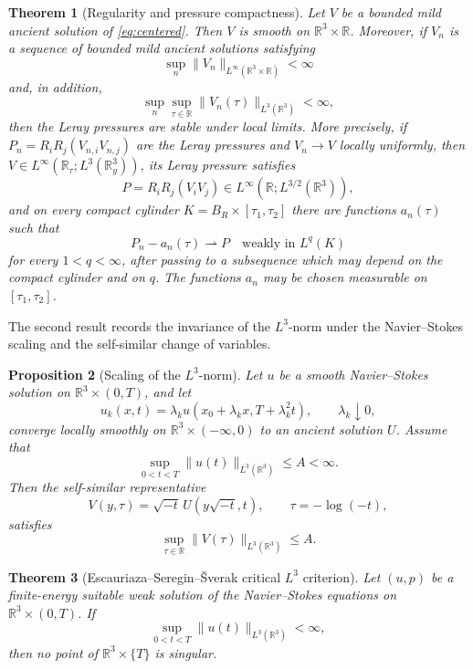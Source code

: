 \documentclass[11pt]{amsart}
\theoremstyle{plain}
\newtheorem{theorem}{Theorem}[section]
\newtheorem{proposition}[theorem]{Proposition}
\theoremstyle{definition}
\theoremstyle{remark}
\numberwithin{equation}{section}
\begin{document}
\begin{theorem}[Regularity and pressure compactness]\label{thm:gauges}
Let \(V\) be a bounded mild ancient solution of \eqref{eq:centered}.  Then
\(V\) is smooth on \(\mathbb R^3\times\mathbb R\).  Moreover, if \(V_n\) is a sequence of
bounded mild ancient solutions satisfying
\[
   \sup_n\|V_n\|_{L^\infty(\mathbb R^3\times\mathbb R)}<\infty
\]
and, in addition,
\[
   \sup_n\sup_{\tau\in\mathbb R}\|V_n(\tau)\|_{L^3(\mathbb R^3)}<\infty,
\]
then the Leray pressures are stable under local limits.  More precisely, if
\(P_n=R_iR_j(V_{n,i}V_{n,j})\) are the Leray pressures and
\(V_n\to V\) locally uniformly, then
\(V\in L^\infty(\mathbb R_\tau;L^3(\mathbb R^3_y))\), its Leray
pressure satisfies
\[
   P=R_iR_j(V_iV_j)\in L^\infty(\mathbb R;L^{3/2}(\mathbb R^3)),
\]
and on every compact cylinder
\(K=B_R\times[\tau_1,\tau_2]\) there are functions \(a_n(\tau)\) such that
\[
   P_n-a_n(\tau)
   \rightharpoonup P
   \quad\text{weakly in }L^q(K)
\]
for every \(1<q<\infty\), after passing to a subsequence which may depend on
the compact cylinder and on \(q\).  The functions \(a_n\) may be chosen
measurable on \([\tau_1,\tau_2]\).
\end{theorem}

The second result records the invariance of the \(L^3\)-norm under the
Navier--Stokes scaling and the self-similar change of variables.

\begin{proposition}[Scaling of the \(L^3\)-norm]\label{prop:L3-transfer}
Let \(u\) be a smooth Navier--Stokes solution on
\(\mathbb R^3\times(0,T)\), and let
\[
   u_k(x,t)=\lambda_k u(x_0+\lambda_k x,T+\lambda_k^2t),
   \qquad \lambda_k\downarrow0,
\]
converge locally smoothly on \(\mathbb R^3\times(-\infty,0)\) to an ancient solution
\(U\).  Assume that
\[
   \sup_{0<t<T}\|u(t)\|_{L^3(\mathbb R^3)}\le A<\infty .
\]
Then the self-similar representative
\[
   V(y,\tau)=\sqrt{-t}\,U(y\sqrt{-t},t),
   \qquad \tau=-\log(-t),
\]
satisfies
\[
   \sup_{\tau\in\mathbb R}\|V(\tau)\|_{L^3(\mathbb R^3)}\le A .
\]
\end{proposition}

\begin{theorem}[Escauriaza--Seregin--\v{S}verak critical \(L^3\) criterion]
\label{thm:ESS-L3}
Let \((u,p)\) be a finite-energy suitable weak solution of the
Navier--Stokes equations on \(\mathbb R^3\times(0,T)\).  If
\[
   \sup_{0<t<T}\|u(t)\|_{L^3(\mathbb R^3)}<\infty ,
\]
then no point of \(\mathbb R^3\times\{T\}\) is singular.
\end{theorem}
\end{document}
